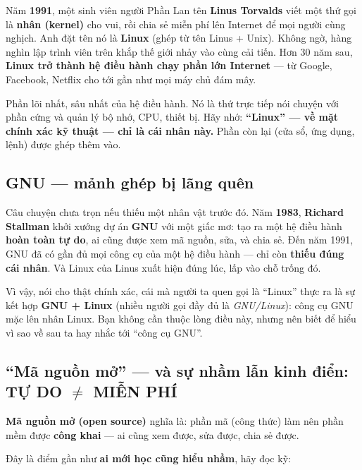 \documentclass[12pt,a4paper]{article}
\begin{document}
Năm \textbf{1991}, một sinh viên người Phần Lan tên \textbf{Linus Torvalds} viết một thứ gọi là \textbf{nhân (kernel)} cho vui, rồi chia sẻ miễn phí lên Internet để mọi người cùng nghịch. Anh đặt tên nó là \textbf{Linux} (ghép từ tên Linus + Unix). Không ngờ, hàng nghìn lập trình viên trên khắp thế giới nhảy vào cùng cải tiến. Hơn 30 năm sau, \textbf{Linux trở thành hệ điều hành chạy phần lớn Internet} — từ Google, Facebook, Netflix cho tới gần như mọi máy chủ đám mây.

\begin{defbox}
Phần lõi nhất, sâu nhất của hệ điều hành. Nó là thứ trực tiếp nói chuyện với phần cứng và quản lý bộ nhớ, CPU, thiết bị. Hãy nhớ: \textbf{``Linux'' — về mặt chính xác kỹ thuật — chỉ là cái nhân này.} Phần còn lại (cửa sổ, ứng dụng, lệnh) được ghép thêm vào.
\end{defbox}

\subsection{GNU — mảnh ghép bị lãng quên}

Câu chuyện chưa trọn nếu thiếu một nhân vật trước đó. Năm \textbf{1983}, \textbf{Richard Stallman} khởi xướng dự án \textbf{GNU} với một giấc mơ: tạo ra một hệ điều hành \textbf{hoàn toàn tự do}, ai cũng được xem mã nguồn, sửa, và chia sẻ. Đến năm 1991, GNU đã có gần đủ mọi công cụ của một hệ điều hành — chỉ còn \textbf{thiếu đúng cái nhân}. Và Linux của Linus xuất hiện đúng lúc, lấp vào chỗ trống đó.

Vì vậy, nói cho thật chính xác, cái mà người ta quen gọi là ``Linux'' thực ra là sự kết hợp \textbf{GNU + Linux} (nhiều người gọi đầy đủ là \textit{GNU/Linux}): công cụ GNU mặc lên nhân Linux. Bạn không cần thuộc lòng điều này, nhưng nên biết để hiểu vì sao về sau ta hay nhắc tới ``công cụ GNU''.

\subsection{``Mã nguồn mở'' — và sự nhầm lẫn kinh điển: TỰ DO $\neq$ MIỄN PHÍ}

\textbf{Mã nguồn mở (open source)} nghĩa là: phần mã (công thức) làm nên phần mềm được \textbf{công khai} — ai cũng xem được, sửa được, chia sẻ được.

Đây là điểm gần như \textbf{ai mới học cũng hiểu nhầm}, hãy đọc kỹ:
\end{document}
